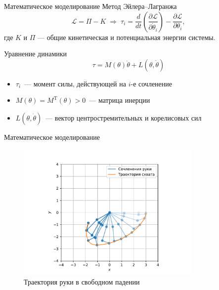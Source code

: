 \documentclass[16pt]{beamer}
\begin{document}
    \begin{frame}{Математическое моделирование}
        Метод Эйлера--Лагранжа
        $$
            \mathcal{L} = \Pi - K
            \;\Longrightarrow\;
            \tau_i
            =
              \frac{d}{dt}\left(\frac{\partial \mathcal{L}}{\partial \dot \theta_i}\right)
            - \frac{\partial \mathcal{L}}{\partial \theta_i},
        $$
        где $K$ и $\Pi$ --- общие кинетическая и потенциальная энергии системы.
        \vfill
        \begin{block}{Уравнение динамики}
            $$
                \tau = M(\theta)\ddot\theta + L(\theta, \dot\theta)
            $$
            \begin{itemize}
                \item $\tau_i$~--- момент силы, действующей на $i$-е сочленение
                \item $M(\theta)=M^{\mathrm{T}}(\theta)>0$~--- матрица инерции
                \item $L(\theta, \dot\theta)$~--- вектор центростремительных и корелисовых сил
            \end{itemize}
        \end{block}
    \end{frame}

    \begin{frame}{Математическое моделирование}
        \begin{figure}
            \includegraphics[width=0.8\textwidth]{discrete_pendulum.pdf}
            \caption{Траектория руки в свободном падении}
        \end{figure}
    \end{frame}
\end{document}
